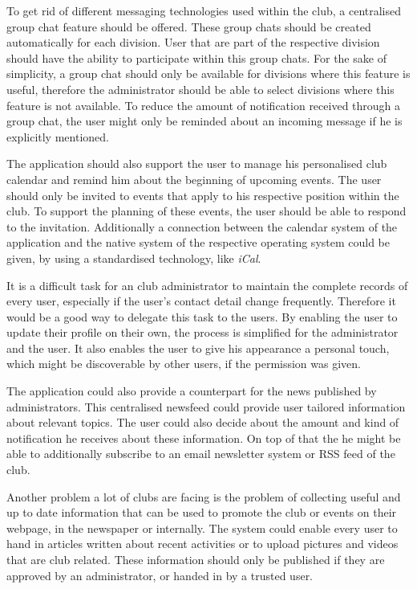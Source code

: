 To get rid of different messaging technologies used within the club, a centralised group chat feature should be offered. These group chats should be created automatically for each division. User that are part of the respective division should have the ability to participate within this group chats. For the sake of simplicity, a group chat should only be available for divisions where this feature is useful, therefore the administrator should be able to select divisions where this feature is not available. To reduce the amount of notification received through a group chat, the user might only be reminded about an incoming message if he is explicitly mentioned.

The application should also support the user to manage his personalised club calendar and remind him about the beginning of upcoming events. The user should only be invited to events that apply to his respective position within the club. To support the planning of these events, the user should be able to respond to the invitation. Additionally a connection between the calendar system of the application and the native system of the respective operating system could be given, by using a standardised technology, like \emph{iCal}.

It is a difficult task for an club administrator to maintain the complete records of every user, especially if the user's contact detail change frequently. Therefore it would be a good way to delegate this task to the users. By enabling the user to update their profile on their own, the process is simplified for the administrator and the user. It also enables the user to give his appearance a personal touch, which might be discoverable by other users, if the permission was given.

The application could also provide a counterpart for the news published by administrators. This centralised newsfeed could provide user tailored information about relevant topics. The user could also decide about the amount and kind of notification he receives about these information. On top of that the he might be able to additionally subscribe to an email newsletter system or \gls{RSS} feed of the club.

Another problem a lot of clubs are facing is the problem of collecting useful and up to date information that can be used to promote the club or events on their webpage, in the newspaper or internally. The system could enable every user to hand in articles written about recent activities or to upload pictures and videos that are club related. These information should only be published if they are approved by an administrator, or handed in by a trusted user.

